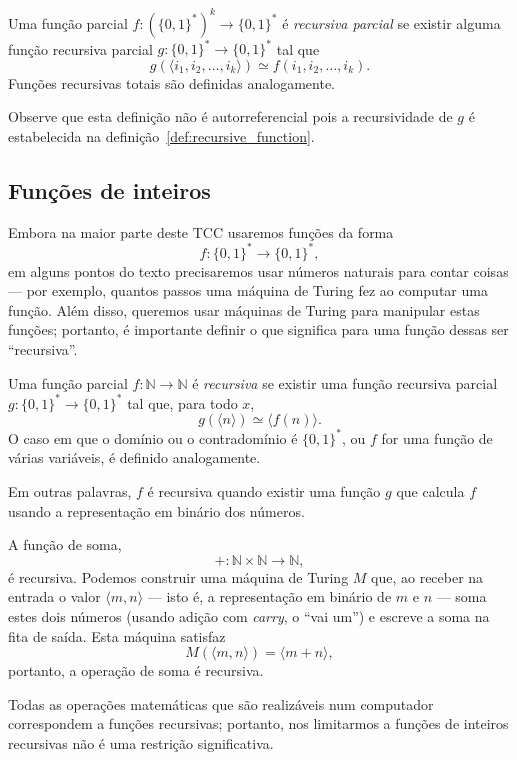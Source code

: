 \begin{definition}
    \label{def:multi_valued_recursive_function}
    Uma função parcial $f: (\{0, 1\}^*)^k \to \{0, 1\}^*$ é \emph{recursiva parcial}
    se existir alguma função recursiva parcial $g: \{0, 1\}^* \to \{0, 1\}^*$
    tal que
    \begin{equation*}
        g(\langle i_1, i_2, \dots, i_k \rangle) \simeq f(i_1, i_2, \dots, i_k).
    \end{equation*}
    Funções recursivas totais são definidas analogamente.
\end{definition}

Observe que esta definição não é autorreferencial
pois a recursividade de $g$ é estabelecida na definição~\ref{def:recursive_function}.

\subsection{Funções de inteiros}

Embora na maior parte deste TCC usaremos funções da forma
\begin{equation*}
    f : \{0, 1\}^* \to \{0, 1\}^*,
\end{equation*}
em alguns pontos do texto precisaremos usar números naturais para contar coisas
--- por exemplo,
quantos passos uma máquina de Turing fez ao computar uma função.
Além disso,
queremos usar máquinas de Turing para manipular estas funções;
portanto,
é importante definir o que significa para uma função dessas ser ``recursiva''.

\begin{definition}
    Uma função parcial $f: \mathbb N \to \mathbb N$ é \emph{recursiva}
    se existir uma função recursiva parcial $g: \{0, 1\}^* \to \{0, 1\}^*$
    tal que, para todo $x$,
    \begin{equation*}
        g(\langle n \rangle) \simeq \langle f(n) \rangle.
    \end{equation*}
    O caso em que o domínio ou o contradomínio é $\{0, 1\}^*$,
    ou $f$ for uma função de várias variáveis,
    é definido analogamente.
\end{definition}

Em outras palavras,
$f$ é recursiva quando existir uma função $g$
que calcula $f$ usando a representação em binário dos números.

\begin{example}
    A função de soma,
    \begin{equation*}
        +: \mathbb N \times \mathbb N \to \mathbb N,
    \end{equation*}
    é recursiva.
    Podemos construir uma máquina de Turing $M$ que,
    ao receber na entrada o valor $\langle m, n \rangle$
    --- isto é, a representação em binário de $m$ e $n$ ---
    soma estes dois números
    (usando adição com \emph{carry}, o ``vai um'')
    e escreve a soma na fita de saída.
    Esta máquina satisfaz
    \begin{equation*}
        M(\langle m, n \rangle) = \langle m+n \rangle,
    \end{equation*}
    portanto, a operação de soma é recursiva.
\end{example}

Todas as operações matemáticas que são realizáveis num computador
correspondem a funções recursivas;
portanto,
nos limitarmos a funções de inteiros recursivas não é uma restrição significativa.
